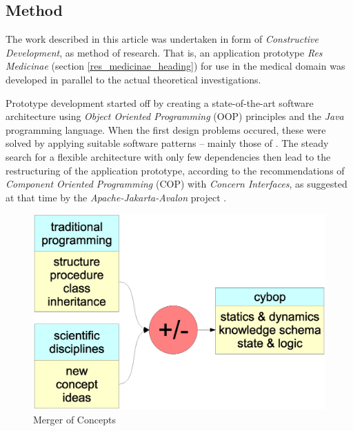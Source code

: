 %
%
%
%
%
%
%

\subsection{Method}
\label{method_heading}

The work described in this article was undertaken in form of
\emph{Constructive Development}, as method of research. That is, an application
prototype \emph{Res Medicinae} (section \ref{res_medicinae_heading}) for use in
the medical domain was developed in parallel to the actual theoretical
investigations.

Prototype development started off by creating a state-of-the-art software
architecture using \emph{Object Oriented Programming} (OOP) principles and the
\emph{Java} programming language. When the first design problems occured, these
were solved by applying suitable software patterns -- mainly those of
\cite{gamma1995,buschmann,fowler2002}. The steady search for a flexible
architecture with only few dependencies then lead to the restructuring of the
application prototype, according to the recommendations of
\emph{Component Oriented Programming} (COP) with \emph{Concern Interfaces}, as
suggested at that time by the \emph{Apache-Jakarta-Avalon} project \cite{avalon}.

\begin{figure}[ht]
    \begin{center}
        \includegraphics[scale=0.2]{vector/method.eps}
        \caption{Merger of Concepts}
        \label{method_figure}
    \end{center}
\end{figure}

